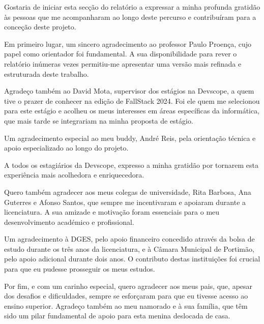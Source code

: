 
\begin{acknowledgements}
Gostaria de iniciar esta secção do relatório a expressar a minha profunda gratidão às pessoas que me acompanharam ao longo deste percurso e contribuíram para a conceção deste projeto.

Em primeiro lugar, um sincero agradecimento ao professor Paulo Proença, cujo papel como orientador foi fundamental. A sua disponibilidade para rever o relatório inúmeras vezes permitiu-me apresentar uma versão mais refinada e estruturada deste trabalho.

Agradeço também ao David Mota, supervisor dos estágios na Devscope, a quem tive o prazer de conhecer na edição de FallStack 2024. Foi ele quem me selecionou para este estágio e acolheu os meus interesses em áreas específicas da informática, que mais tarde se integrariam na minha proposta de estágio.

Um agradecimento especial ao meu buddy, André Reis, pela orientação técnica e apoio especializado ao longo do projeto.

A todos os estagiários da Devscope, expresso a minha gratidão por tornarem esta experiência mais acolhedora e enriquecedora.

Quero também agradecer aos meus colegas de universidade, Rita Barbosa, Ana Guterres e Afonso Santos, que sempre me incentivaram e apoiaram durante a licenciatura. A sua amizade e motivação foram essenciais para o meu desenvolvimento académico e profissional.

Um agradecimento à DGES, pelo apoio financeiro concedido através da bolsa de estudo durante os três anos da licenciatura, e à Câmara Municipal de Portimão, pelo apoio adicional durante dois anos. O contributo destas instituições foi crucial para que eu pudesse prosseguir os meus estudos.

Por fim, e com um carinho especial, quero agradecer aos meus pais, que, apesar dos desafios e dificuldades, sempre se esforçaram para que eu tivesse acesso ao ensino superior. Agradeço também ao meu namorado e à sua família, que têm sido um pilar fundamental de apoio para esta menina deslocada de casa.
\end{acknowledgements}




